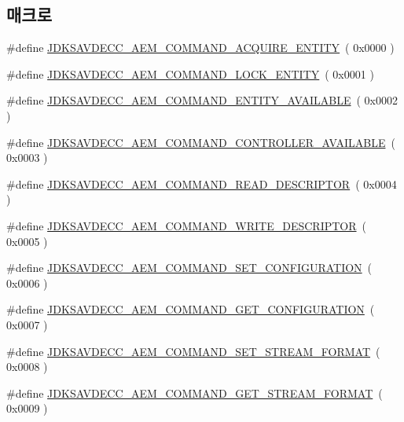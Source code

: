 \subsection*{매크로}
\begin{DoxyCompactItemize}
\item 
\#define \hyperlink{group__command_ga74ebee0a0531409bb10f7ce9e1216c04}{J\+D\+K\+S\+A\+V\+D\+E\+C\+C\+\_\+\+A\+E\+M\+\_\+\+C\+O\+M\+M\+A\+N\+D\+\_\+\+A\+C\+Q\+U\+I\+R\+E\+\_\+\+E\+N\+T\+I\+TY}~( 0x0000 )
\item 
\#define \hyperlink{group__command_ga96be22db90d10cec463db06ab42751c4}{J\+D\+K\+S\+A\+V\+D\+E\+C\+C\+\_\+\+A\+E\+M\+\_\+\+C\+O\+M\+M\+A\+N\+D\+\_\+\+L\+O\+C\+K\+\_\+\+E\+N\+T\+I\+TY}~( 0x0001 )
\item 
\#define \hyperlink{group__command_ga9fd008c3de503ebf99111e4464e3142d}{J\+D\+K\+S\+A\+V\+D\+E\+C\+C\+\_\+\+A\+E\+M\+\_\+\+C\+O\+M\+M\+A\+N\+D\+\_\+\+E\+N\+T\+I\+T\+Y\+\_\+\+A\+V\+A\+I\+L\+A\+B\+LE}~( 0x0002 )
\item 
\#define \hyperlink{group__command_ga742fafae5e26884f3caac94dcc6c2814}{J\+D\+K\+S\+A\+V\+D\+E\+C\+C\+\_\+\+A\+E\+M\+\_\+\+C\+O\+M\+M\+A\+N\+D\+\_\+\+C\+O\+N\+T\+R\+O\+L\+L\+E\+R\+\_\+\+A\+V\+A\+I\+L\+A\+B\+LE}~( 0x0003 )
\item 
\#define \hyperlink{group__command_gaa6a32a290cbec71466b571590b05fd00}{J\+D\+K\+S\+A\+V\+D\+E\+C\+C\+\_\+\+A\+E\+M\+\_\+\+C\+O\+M\+M\+A\+N\+D\+\_\+\+R\+E\+A\+D\+\_\+\+D\+E\+S\+C\+R\+I\+P\+T\+OR}~( 0x0004 )
\item 
\#define \hyperlink{group__command_ga2042c293682f0eb1b948a7be2967f3cb}{J\+D\+K\+S\+A\+V\+D\+E\+C\+C\+\_\+\+A\+E\+M\+\_\+\+C\+O\+M\+M\+A\+N\+D\+\_\+\+W\+R\+I\+T\+E\+\_\+\+D\+E\+S\+C\+R\+I\+P\+T\+OR}~( 0x0005 )
\item 
\#define \hyperlink{group__command_ga4f9fbd74323f44d31d0bc0f1805e2ddf}{J\+D\+K\+S\+A\+V\+D\+E\+C\+C\+\_\+\+A\+E\+M\+\_\+\+C\+O\+M\+M\+A\+N\+D\+\_\+\+S\+E\+T\+\_\+\+C\+O\+N\+F\+I\+G\+U\+R\+A\+T\+I\+ON}~( 0x0006 )
\item 
\#define \hyperlink{group__command_gafcdad66350136537c983119197f9aab2}{J\+D\+K\+S\+A\+V\+D\+E\+C\+C\+\_\+\+A\+E\+M\+\_\+\+C\+O\+M\+M\+A\+N\+D\+\_\+\+G\+E\+T\+\_\+\+C\+O\+N\+F\+I\+G\+U\+R\+A\+T\+I\+ON}~( 0x0007 )
\item 
\#define \hyperlink{group__command_ga5a4c1db8bb66e83da7bcdff6a4e2c7e7}{J\+D\+K\+S\+A\+V\+D\+E\+C\+C\+\_\+\+A\+E\+M\+\_\+\+C\+O\+M\+M\+A\+N\+D\+\_\+\+S\+E\+T\+\_\+\+S\+T\+R\+E\+A\+M\+\_\+\+F\+O\+R\+M\+AT}~( 0x0008 )
\item 
\#define \hyperlink{group__command_ga44127c37d4df5fa78a40d28e053ac62c}{J\+D\+K\+S\+A\+V\+D\+E\+C\+C\+\_\+\+A\+E\+M\+\_\+\+C\+O\+M\+M\+A\+N\+D\+\_\+\+G\+E\+T\+\_\+\+S\+T\+R\+E\+A\+M\+\_\+\+F\+O\+R\+M\+AT}~( 0x0009 )

\end{DoxyCompactItemize}
